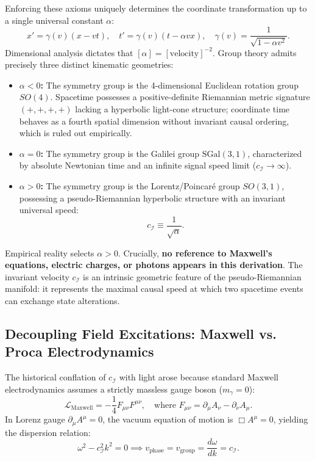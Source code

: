 \documentclass[11pt,a4paper]{article}
\begin{document}
Enforcing these axioms uniquely determines the coordinate transformation up to a single universal constant $\alpha$:
\begin{equation}
x' = \gamma(v) (x - v t), \quad t' = \gamma(v) \left(t - \alpha v x\right), \quad \gamma(v) = \frac{1}{\sqrt{1 - \alpha v^2}}.
\end{equation}
Dimensional analysis dictates that $[\alpha] = [\text{velocity}]^{-2}$. Group theory admits precisely three distinct kinematic geometries:
\begin{itemize}
    \item \textbf{$\alpha < 0$:} The symmetry group is the 4-dimensional Euclidean rotation group $SO(4)$. Spacetime possesses a positive-definite Riemannian metric signature $(+,+,+,+)$ lacking a hyperbolic light-cone structure; coordinate time behaves as a fourth spatial dimension without invariant causal ordering, which is ruled out empirically.
    \item \textbf{$\alpha = 0$:} The symmetry group is the Galilei group $\mathrm{SGal}(3,1)$, characterized by absolute Newtonian time and an infinite signal speed limit ($c_{\mathcal{I}} \to \infty$).
    \item \textbf{$\alpha > 0$:} The symmetry group is the Lorentz/Poincar\'e group $SO(3,1)$, possessing a pseudo-Riemannian hyperbolic structure with an invariant universal speed:
    \begin{equation}
    c_{\mathcal{I}} \equiv \frac{1}{\sqrt{\alpha}}.
    \end{equation}
\end{itemize}

Empirical reality selects $\alpha > 0$. Crucially, \textbf{no reference to Maxwell's equations, electric charges, or photons appears in this derivation}. The invariant velocity $c_{\mathcal{I}}$ is an intrinsic geometric feature of the pseudo-Riemannian manifold: it represents the maximal causal speed at which two spacetime events can exchange state alterations.

\subsection{Decoupling Field Excitations: Maxwell vs. Proca Electrodynamics}

The historical conflation of $c_{\mathcal{I}}$ with light arose because standard Maxwell electrodynamics assumes a strictly massless gauge boson ($m_\gamma = 0$):
\begin{equation}
\mathcal{L}_{\text{Maxwell}} = -\frac{1}{4} F_{\mu\nu} F^{\mu\nu}, \quad \text{where } F_{\mu\nu} = \partial_\mu A_\nu - \partial_\nu A_\mu.
\end{equation}
In Lorenz gauge $\partial_\mu A^\mu = 0$, the vacuum equation of motion is $\Box A^\mu = 0$, yielding the dispersion relation:
\begin{equation}
\omega^2 - c_{\mathcal{I}}^2 k^2 = 0 \implies v_{\text{phase}} = v_{\text{group}} = \frac{d\omega}{dk} = c_{\mathcal{I}}.
\end{equation}
\end{document}
